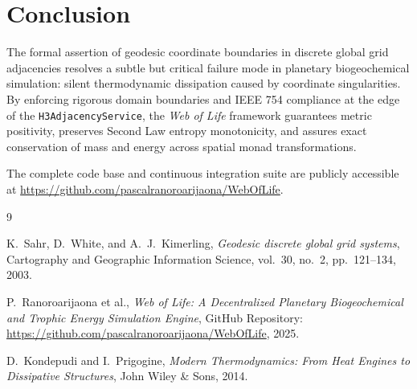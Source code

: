 \documentclass[11pt, a4paper]{article}
\begin{document}
\section{Conclusion}

The formal assertion of geodesic coordinate boundaries in discrete global grid adjacencies resolves a subtle but critical failure mode in planetary biogeochemical simulation: silent thermodynamic dissipation caused by coordinate singularities. By enforcing rigorous domain boundaries and IEEE 754 compliance at the edge of the \texttt{H3AdjacencyService}, the \textit{Web of Life} framework guarantees metric positivity, preserves Second Law entropy monotonicity, and assures exact conservation of mass and energy across spatial monad transformations.

The complete code base and continuous integration suite are publicly accessible at \url{https://github.com/pascalranoroarijaona/WebOfLife}.

\begin{thebibliography}{9}

K.~Sahr, D.~White, and A.~J.~Kimerling,
\textit{Geodesic discrete global grid systems},
Cartography and Geographic Information Science, vol.~30, no.~2, pp.~121--134, 2003.

P.~Ranoroarijaona et al.,
\textit{Web of Life: A Decentralized Planetary Biogeochemical and Trophic Energy Simulation Engine},
GitHub Repository: \url{https://github.com/pascalranoroarijaona/WebOfLife}, 2025.

D.~Kondepudi and I.~Prigogine,
\textit{Modern Thermodynamics: From Heat Engines to Dissipative Structures},
John Wiley \& Sons, 2014.

\end{thebibliography}
\end{document}
